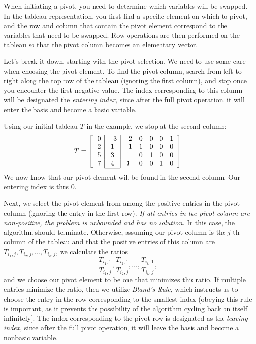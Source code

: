 When initiating a pivot, you need to determine which variables will be swapped.
In the tableau representation, you first find a specific element on which to pivot, and the row and column that contain the pivot element correspond to the variables that need to be swapped.
Row operations are then performed on the tableau so that the pivot column becomes an elementary vector.

Let's break it down, starting with the pivot selection. We need to use some care when choosing the pivot element.
To find the pivot column, search from left to right along the top row of the tableau (ignoring the first column), and stop once you encounter the first negative value.
The index corresponding to this column will be designated the \emph{entering index}, since after the full pivot operation, it will enter
the basis and become a basic variable.

Using our initial tableau $T$ in the example, we stop at the second column:
\[ T = \left[ \:
\begin{array}{*{7}{c}}
\cline{2-2}
0 & \multicolumn{1}{|c}{-3} & \multicolumn{1}{|c}{-2} & 0 & 0 & 0 & 1\\
2 & \multicolumn{1}{|c}{1} & \multicolumn{1}{|c}{-1} & 1 & 0 & 0 & 0\\
5 & \multicolumn{1}{|c}{3} & \multicolumn{1}{|c}{1} & 0 & 1 & 0 & 0\\
7 & \multicolumn{1}{|c}{4} & \multicolumn{1}{|c}{3} & 0 & 0 & 1 & 0\\
\cline{2-2}
\end{array}
\right] \]
We now know that our pivot element will be found in the second column. Our entering index is thus $0$.

Next, we select the pivot element from among the positive entries in the pivot column (ignoring the entry in the first row).
\emph{If all entries in the pivot column are non-positive, the problem is unbounded and has no solution.}
In this case, the algorithm should terminate.
Otherwise, assuming our pivot column is the $j$-th column of the tableau and that the positive entries of this column are
$T_{i_1, j}, T_{i_2, j}, \ldots, T_{i_k, j}$, we calculate the ratios
\[
\frac{T_{i_1,1}}{T_{i_1,j}}, \frac{T_{i_2,1}}{T_{i_2,j}}, \ldots, \frac{T_{i_k,1}}{T_{i_k,j}},
\]
and we choose our pivot element to be one that minimizes this ratio. If multiple entries minimize the ratio, then we utilize \emph{Bland's Rule}, which instructs us to choose the entry in the row corresponding to the smallest index (obeying this rule is important, as it prevents the possibility of the algorithm cycling back on itself infinitely).
The index corresponding to the pivot row is designated as the \emph{leaving index}, since after the full pivot operation, it will leave the basis and become a nonbasic variable.

